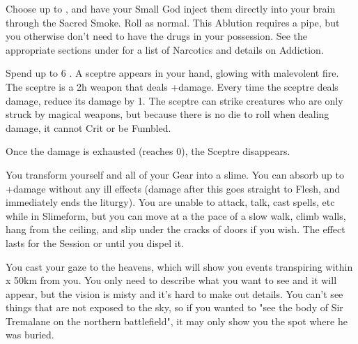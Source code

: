 \begin{multicols*}{2}
\newpage

\LITURGY [
  Name = Sacred Smoke,
  Link = arcana-mystery-sacred-smoke,
  Paradigm = Heathen
]

Choose up to \DICE {}, and have your Small God inject them directly into your brain through the Sacred Smoke. Roll  as normal. This Ablution requires a pipe, but you otherwise don't need to have the drugs in your possession.  See the appropriate sections under  for a list of Narcotics and details on Addiction.

\LITURGY [
  Name = Sceptre of Ruin,
  Link = arcana-mystery-lucky-day,
  Paradigm = Ruinous
]

Spend up to 6 \DICE. A sceptre appears in your hand, glowing with malevolent fire. The sceptre is a 2h \FOC weapon that deals \DICE+\DICE damage. Every time the sceptre deals damage, reduce its damage by 1. The sceptre can strike creatures who are only struck by magical weapons, but because there is no die to roll when dealing damage, it cannot Crit or be Fumbled. 

Once the damage is exhausted (reaches 0), the Sceptre disappears.


\LITURGY [
  Name = Slimeform,
  Link = arcana-mystery-slimeform,
  Paradigm = Monstrous
]

You transform yourself and all of your Gear into a slime.  You can absorb up to \SUMDICE+\DICE damage without any ill effects (damage after this goes straight to Flesh, and immediately ends the liturgy).  You are unable to attack, talk, cast spells, etc while in Slimeform, but you can move at a the pace of a slow walk, climb walls, hang from the ceiling, and slip under the cracks of doors if you wish.  The effect lasts for the Session or until you dispel it.


\LITURGY [
  Name = Welkin's Gaze,
  Link = arcana-mystery-welkin-gaze,
  Paradigm = Empyrean
]

You cast your gaze to the heavens, which will show you events transpiring within \DICE x 50km from you. You only need to describe what you want to see and it will appear, but the vision is misty and it's hard to make out details.  You can't see things that are not exposed to the sky, so if you wanted to "see the body of Sir Tremalane on the northern battlefield", it may only show you the spot where he was buried.




\end{multicols*}
